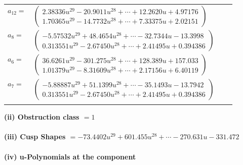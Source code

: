 \documentclass[1p]{elsarticle_modified}
\theoremstyle{definition}
\begin{document}
\begin{tabular}{m{7pt} m{180pt} m{7pt} m{180pt} }
\flushright $a_{12}=$&$\begin{pmatrix}2.38336 u^{29}-20.9011 u^{28}+\cdots+12.2620 u+4.97176\\1.70365 u^{29}-14.7732 u^{28}+\cdots+7.33375 u+2.02151\end{pmatrix}$ \\
\flushright $a_{8}=$&$\begin{pmatrix}-5.57532 u^{29}+48.4654 u^{28}+\cdots-32.7344 u-13.3998\\0.313551 u^{29}-2.67450 u^{28}+\cdots+2.41495 u+0.394386\end{pmatrix}$ \\
\flushright $a_{6}=$&$\begin{pmatrix}36.6261 u^{29}-301.275 u^{28}+\cdots+128.389 u+157.033\\1.01379 u^{29}-8.31609 u^{28}+\cdots+2.17156 u+6.40119\end{pmatrix}$ \\
\flushright $a_{7}=$&$\begin{pmatrix}-5.88887 u^{29}+51.1399 u^{28}+\cdots-35.1493 u-13.7942\\0.313551 u^{29}-2.67450 u^{28}+\cdots+2.41495 u+0.394386\end{pmatrix}$\\&\end{tabular}
\flushleft \textbf{(ii) Obstruction class $= 1$}\\~\\
\flushleft \textbf{(iii) Cusp Shapes $= -73.4402 u^{29}+601.455 u^{28}+\cdots-270.631 u-331.472$}\\~\\
\newpage\renewcommand{\arraystretch}{1}
\flushleft \textbf{(iv) u-Polynomials at the component}\newline \\
\end{document}
